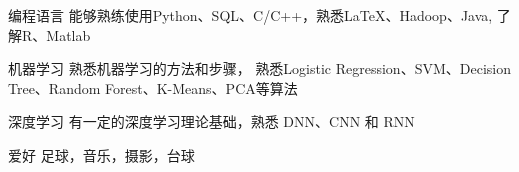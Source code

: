 

\vspace{-1.5mm}
\begin{cvskills}


\cvskill
{编程语言}
{能够熟练使用Python、SQL、C/C++，熟悉\LaTeX、Hadoop、Java, 了解R、Matlab}


\cvskill
{机器学习}
{熟悉机器学习的方法和步骤， 熟悉Logistic Regression、SVM、Decision Tree、Random Forest、K-Means、PCA等算法}


\cvskill
{深度学习}
{有一定的深度学习理论基础，熟悉 DNN、CNN 和 RNN}


\cvskill
{爱好}
{足球，音乐，摄影，台球}


\end{cvskills}
